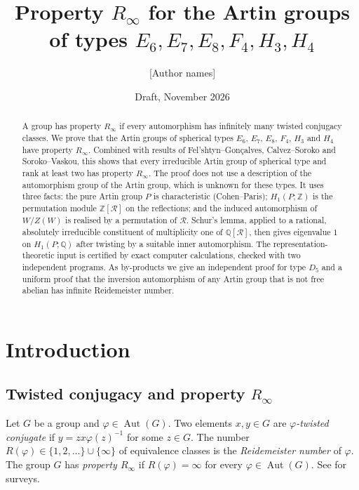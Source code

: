 \documentclass[11pt]{amsart}
\title{Property $R_\infty$ for the Artin groups of types $E_6,E_7,E_8,F_4,H_3,H_4$}
\author{[Author names]}
\date{Draft, November 2026}
\theoremstyle{definition}
\newcommand{\Z}{\mathbb{Z}}
\newcommand{\Q}{\mathbb{Q}}
\newcommand{\R}{\mathcal{R}}
\newcommand{\Aut}{\operatorname{Aut}}
\newcommand{\Rinf}{R_\infty}
\begin{document}
\begin{abstract}
A group has property $\Rinf$ if every automorphism has infinitely many twisted conjugacy classes.
We prove that the Artin groups of spherical types $E_6$, $E_7$, $E_8$, $F_4$, $H_3$ and $H_4$ have
property $\Rinf$. Combined with results of Fel'shtyn--Gon\c{c}alves, Calvez--Soroko and Soroko--Vaskou,
this shows that every irreducible Artin group of spherical type and rank at least two has property $\Rinf$.
The proof does not use a description of the automorphism group of the Artin group, which is unknown for
these types. It uses three facts: the pure Artin group $P$ is characteristic (Cohen--Paris);
$H_1(P;\Z)$ is the permutation module $\Z[\R]$ on the reflections; and the induced automorphism of $W/Z(W)$ is
realised by a permutation of $\R$. Schur's lemma, applied to a rational, absolutely irreducible constituent
of multiplicity one of $\Q[\R]$, then gives eigenvalue $1$ on $H_1(P;\Q)$ after twisting by a suitable
inner automorphism. The representation-theoretic input is certified by exact computer calculations, checked
with two independent programs. As by-products we give an independent proof for type $D_5$ and a uniform
proof that the inversion automorphism of any Artin group that is not free abelian has infinite Reidemeister number.
\end{abstract}

\maketitle

\noindent{}

\section{Introduction}

\subsection{Twisted conjugacy and property $\Rinf$}
Let $G$ be a group and $\varphi\in\Aut(G)$. Two elements $x,y\in G$ are \emph{$\varphi$-twisted conjugate} if
$y=zx\varphi(z)^{-1}$ for some $z\in G$. The number $R(\varphi)\in\{1,2,\dots\}\cup\{\infty\}$ of
equivalence classes is the \emph{Reidemeister number} of $\varphi$. The group $G$ has \emph{property $\Rinf$}
if $R(\varphi)=\infty$ for every $\varphi\in\Aut(G)$. See \cite{FT15,FN16} for surveys.
\end{document}
